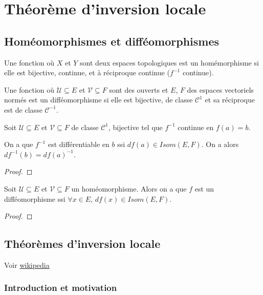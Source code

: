 \chapter{Théorème d'inversion locale}

\section{Homéomorphismes et difféomorphismes}

\begin{definition}
\label{definition_homeomorphisme}
	Une fonction  où $X$ et $Y$ sont deux espaces
	topologiques est un homémorphisme si elle est bijective, continue, et à
	réciproque continue ($f^{-1}$ continue).
\end{definition}

\begin{definition}
\label{definition_diffeomorphism}
Une fonction  où $\mathcal{U}
\subseteq E$ et $\mathcal{V} \subseteq F$ sont des ouverts et $E$, $F$ des espaces
	vectoriels normés est un difféomorphisme si elle est bijective,
	de classe $\mathcal{C}^{1}$ et sa réciproque est de classe
	$\mathcal{C}^{-1}$.
\end{definition}

\begin{proposition}
	Soit  $\mathcal{U} \subseteq
	E$ et $\mathcal{V} \subseteq F$ de classe $\mathcal{C}^{1}$, bijective tel
	que $f^{-1}$ continue en $f(a) = b$.

	On a que $f^{-1}$ est différentiable en $b$ ssi $df(a) \in Isom(E, F)$. On a
	alors $df^{-1}(b) = {df(a)}^{-1}$.
\end{proposition}

\begin{proof}
	
\end{proof}

\begin{proposition}
	Soit  $\mathcal{U} \subseteq
	E$ et $\mathcal{V} \subseteq F$ un homéomorphisme. Alors on a que $f$ est un
	difféomorphisme ssi $\forall x \in E$, $df(x) \in Isom(E, F)$.
\end{proposition}

\begin{proof}
	
\end{proof}

\section{Théorèmes d'inversion locale}
	Voir
	\href{http://fr.wikipedia.org/wiki/Th%C3%A9or%C3%A8me_d%27inversion_locale}{wikipedia}
\subsection{Introduction et motivation}

